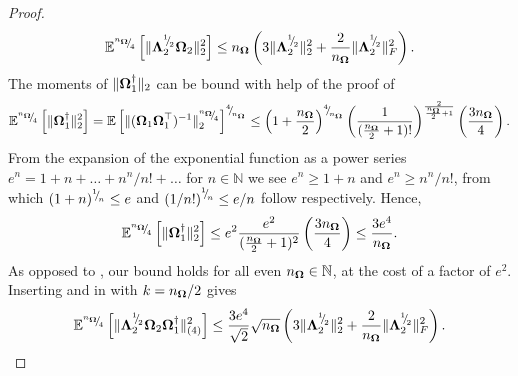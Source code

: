 \documentclass[12pt]{article}
\begin{document}
\begin{proof}
    \begin{equation}
        \mathbb{E}^{{}^{n_{\boldsymbol{\Omega}}}{\mskip -5mu/\mskip -3mu}_{4}}\left[ \lVert \boldsymbol{\Lambda}_2^{{}^{1}{\mskip -5mu/\mskip -3mu}_{2}} \boldsymbol{\Omega}_2 \rVert _2^2 \right]
        \leq n_{\boldsymbol{\Omega}} \left( 3 \lVert \boldsymbol{\Lambda}_2^{{}^{1}{\mskip -5mu/\mskip -3mu}_{2}} \rVert _2^2 + \frac{2}{n_{\boldsymbol{\Omega}}} \lVert \boldsymbol{\Lambda}_2^{{}^{1}{\mskip -5mu/\mskip -3mu}_{2}} \rVert _F^2 \right).
        \label{equ:spectral-norm-bound-applied}
    \end{equation}
    The moments of $\lVert \boldsymbol{\Omega}_1^{\dagger} \rVert _2$ can be bound with help of the proof of \cite[lemma B.3]{tropp-2023-randomized-algorithms}
    \begin{equation}
        \mathbb{E}^{\sfrac{n_{\mtx{\Omega}}}{4}}\left[ \lVert \mtx{\Omega}_1^{\dagger} \rVert _2^2 \right]
        = \mathbb{E}\left[ \lVert ( \mtx{\Omega}_1 \mtx{\Omega}_1^{\top} )^{-1} \rVert _2^{\sfrac{n_{\mtx{\Omega}}}{4}} \right]^{\sfrac{4}{n_{\mtx{\Omega}}}}%
        \leq \left( 1 + \frac{n_{\mtx{\Omega}}}{2} \right)^{\sfrac{4}{n_{\mtx{\Omega}}}} \left( \frac{1}{(\frac{n_{\mtx{\Omega}}}{2} + 1)!}\right)^{\frac{2}{\frac{n_{\mtx{\Omega}}}{2} + 1}} \left( \frac{3 n_{\mtx{\Omega}}}{4}\right).
    \end{equation}
    From the expansion of the exponential function as a power series $e^n = 1 + n + \dots + n^n/n! + \dots$ for $n \in \mathbb{N}$ we see $e^n \geq 1 + n$ and $e^n \geq n^n / n!$, from which $(1 + n)^{{}^{1}{\mskip -5mu/\mskip -3mu}_{n}} \leq e$ and $\left( 1/n! \right)^{{}^{1}{\mskip -5mu/\mskip -3mu}_{n}} \leq e/n$ follow respectively. Hence,
    \begin{equation}
        \mathbb{E}^{{}^{n_{\boldsymbol{\Omega}}}{\mskip -5mu/\mskip -3mu}_{4}}\left[ \lVert \boldsymbol{\Omega}_1^{\dagger} \rVert _2^2 \right]
        \leq e^2 \frac{e^2}{(\frac{n_{\boldsymbol{\Omega}}}{2}+ 1)^2} \left( \frac{3 n_{\boldsymbol{\Omega}}}{4}\right)
        \leq \frac{3 e^4}{n_{\boldsymbol{\Omega}}}.
        \label{equ:pinv-spectral-norm-bound}
    \end{equation}
    As opposed to \cite[lemma B.3]{tropp-2023-randomized-algorithms}, our bound holds for all even $n_{\boldsymbol{\Omega}} \in \mathbb{N}$, at the cost of a factor of $e^2$. Inserting  and   in  with $k = n_{\boldsymbol{\Omega}} / 2$ gives
    \begin{equation}
        \mathbb{E}^{\sfrac{n_{\mtx{\Omega}}}{4}}\left[ \lVert \mtx{\Lambda}_2^{\sfrac{1}{2}} \mtx{\Omega}_2 \mtx{\Omega}_1^{\dagger} \rVert _{(4)}^2 \right]
        \leq \frac{3 e^4}{\sqrt{2}}  \sqrt{n_{\mtx{\Omega}}} \left( 3 \lVert \mtx{\Lambda}_2^{\sfrac{1}{2}} \rVert _2^2 + \frac{2}{n_{\mtx{\Omega}}} \lVert \mtx{\Lambda}_2^{\sfrac{1}{2}} \rVert _F^2 \right).

\end{equation}
\end{proof}
\end{document}
